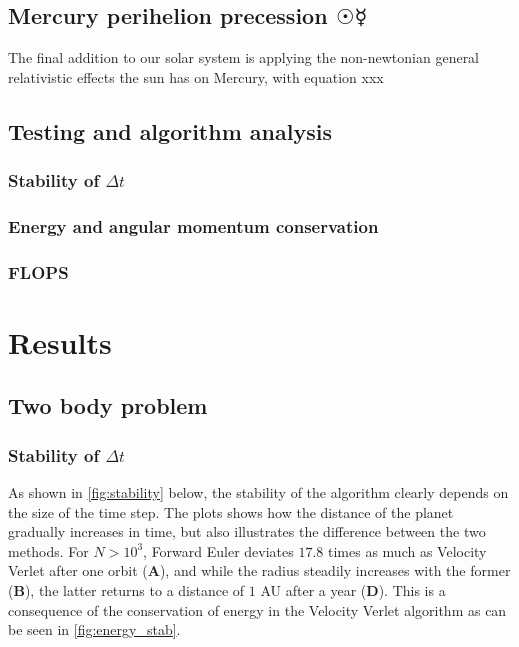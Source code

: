 \documentclass[10pt]{article}
\begin{document}
\begin{multicols}{2}
\subsection{Mercury perihelion precession \texorpdfstring{$\Sun\Mercury$}{}} 
The final addition to our solar system is applying the non-newtonian
general relativistic effects the sun has on Mercury, with equation xxx

\subsection{Testing and algorithm analysis}
\subsubsection{Stability of \texorpdfstring{$\Delta t$}{}}
\subsubsection{Energy and angular momentum conservation}
\subsubsection{FLOPS}

\section{Results}
\subsection{Two body problem}
\subsubsection{Stability of $\Delta t$}

As shown in \cref{fig:stability} below, the stability of the algorithm
clearly depends on the size of the time step. The plots shows how the
distance of the planet gradually increases in time, but also illustrates
the difference between the two methods. For $N > 10^3$, Forward Euler
deviates $17.8$ times as much as Velocity Verlet after one
orbit (\textbf{A}), and while the radius steadily increases with the former
(\textbf{B}), the latter returns to a distance of
$1$ AU after a year (\textbf{D}). This is a consequence of the conservation
of energy in the Velocity Verlet algorithm as can be seen in
\cref{fig:energy_stab}. 


\end{multicols}
\end{document}
